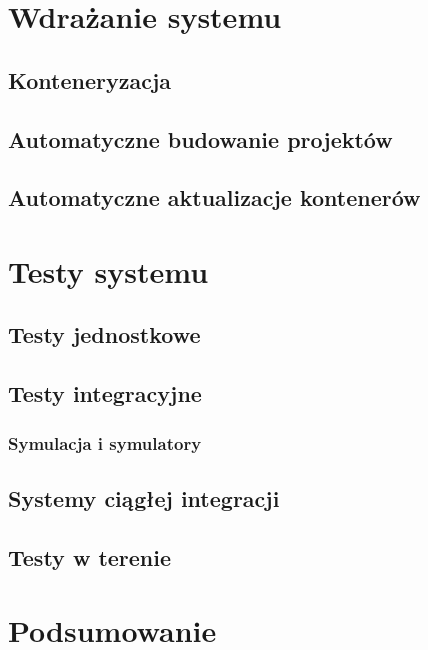 \chapter{Wdrażanie systemu}

\section{Konteneryzacja}
\section{Automatyczne budowanie projektów}
\section{Automatyczne aktualizacje kontenerów}


\chapter{Testy systemu}

\section{Testy jednostkowe}
\section{Testy integracyjne}
\subsection{Symulacja i symulatory}
\section{Systemy ciągłej integracji}
\section{Testy w terenie}

\chapter{Podsumowanie}

